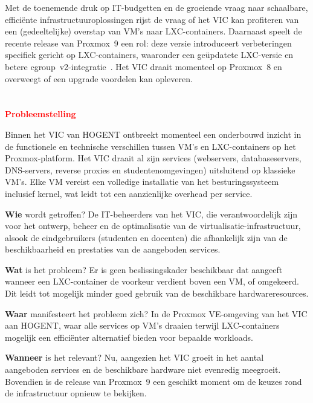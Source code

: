 Met de toenemende druk op IT-budgetten en de groeiende vraag naar schaalbare, efficiënte infrastructuuroplossingen rijst de vraag of het VIC kan profiteren van een (gedeeltelijke) overstap van VM's naar LXC-containers. Daarnaast speelt de recente release van Proxmox~9 een rol: deze versie introduceert verbeteringen specifiek gericht op LXC-containers, waaronder een geüpdatete LXC-versie en betere cgroup~v2-integratie~\autocite{Xtom2025}. Het VIC draait momenteel op Proxmox~8 en overweegt of een upgrade voordelen kan opleveren.

\section{}%
\label{sec:probleemstelling}

\textcolor{red}{\textbf{Probleemstelling}}

Binnen het VIC van HOGENT ontbreekt momenteel een onderbouwd inzicht in de functionele en technische verschillen tussen VM's en LXC-containers op het Proxmox-platform. Het VIC draait al zijn services (webservers, databaseservers, DNS-servers, reverse proxies en studentenomgevingen) uitsluitend op klassieke VM's. Elke VM vereist een volledige installatie van het besturingssysteem inclusief kernel, wat leidt tot een aanzienlijke overhead per service.

\textbf{Wie} wordt getroffen? De IT-beheerders van het VIC, die verantwoordelijk zijn voor het ontwerp, beheer en de optimalisatie van de virtualisatie-infrastructuur, alsook de eindgebruikers (studenten en docenten) die afhankelijk zijn van de beschikbaarheid en prestaties van de aangeboden services.

\textbf{Wat} is het probleem? Er is geen beslissingskader beschikbaar dat aangeeft wanneer een LXC-container de voorkeur verdient boven een VM, of omgekeerd. Dit leidt tot mogelijk minder goed gebruik van de beschikbare hardwareresources.

\textbf{Waar} manifesteert het probleem zich? In de Proxmox VE-omgeving van het VIC aan HOGENT, waar alle services op VM's draaien terwijl LXC-containers mogelijk een efficiënter alternatief bieden voor bepaalde workloads.

\textbf{Wanneer} is het relevant? Nu, aangezien het VIC groeit in het aantal aangeboden services en de beschikbare hardware niet evenredig meegroeit. Bovendien is de release van Proxmox~9 een geschikt moment om de keuzes rond de infrastructuur opnieuw te bekijken.

